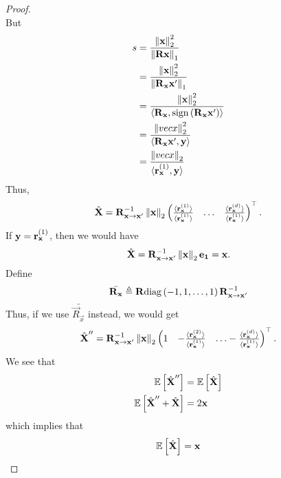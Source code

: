 \documentclass[twoside]{article}
\begin{document}
\begin{proof}
\begin{equation}
    \end{equation}
    But
    \begin{align}
        s &= \frac{\left\lVert\boldsymbol{\mathbf{x}}\right\rVert_2^2}{\left\lVert\boldsymbol{\mathbf{Rx}}\right\rVert_1} \\
          &= \frac{\left\lVert\boldsymbol{\mathbf{x}}\right\rVert_2^2}{\left\lVert\boldsymbol{\mathbf{R}}_{\boldsymbol{\mathbf{x}}}\boldsymbol{\mathbf{x}}^\prime\right\rVert_1} \\
          &= \frac{\left\lVert\boldsymbol{\mathbf{x}}\right\rVert_2^2}{\langle\boldsymbol{\mathbf{R}}_{\boldsymbol{\mathbf{x}}},\mathrm{sign}\left(\boldsymbol{\mathbf{R}}_{\boldsymbol{\mathbf{x}}}\boldsymbol{\mathbf{x}}^\prime\right)\rangle} \\
          &= \frac{\left\lVert vec{x}\right\rVert_2^2}{\langle\boldsymbol{\mathbf{R}}_{\boldsymbol{\mathbf{x}}}\boldsymbol{\mathbf{x}}^\prime,\boldsymbol{\mathbf{y}}\rangle} \\
          &= \frac{\left\lVert vec{x}\right\rVert_2}{\langle\boldsymbol{\mathbf{r}}_{\boldsymbol{\mathbf{x}}}^{\left(1\right)},\boldsymbol{\mathbf{y}}\rangle}
    \end{align}
    Thus,
    \begin{equation}
        \hat{\boldsymbol{\mathbf{X}}} = \boldsymbol{\mathbf{R}}_{\boldsymbol{\mathbf{x}}\rightarrow\boldsymbol{\mathbf{x}}^\prime}^{-1}\left\lVert\boldsymbol{\mathbf{x}}\right\rVert_2\begin{pmatrix}\frac{\langle\boldsymbol{\mathbf{r}}_{\boldsymbol{\mathbf{x}}}^{\left(1\right)}\rangle}{\langle\boldsymbol{\mathbf{r}}_{\boldsymbol{\mathbf{x}}}^{\left(1\right)}\rangle} & \ldots & \frac{\langle\boldsymbol{\mathbf{r}}_{\boldsymbol{\mathbf{x}}}^{\left(d\right)}\rangle}{\langle\boldsymbol{\mathbf{r}}_{\boldsymbol{\mathbf{x}}}^{\left(1\right)}\rangle}\end{pmatrix}^\top.
    \end{equation}
    If \(\boldsymbol{\mathbf{y}} = \boldsymbol{\mathbf{r}}_{\boldsymbol{\mathbf{x}}}^{\left(1\right)}\), then we would have 
    \begin{equation}
        \hat{\boldsymbol{\mathbf{X}}} = \boldsymbol{\mathbf{R}}_{\boldsymbol{\mathbf{x}}\rightarrow\boldsymbol{\mathbf{x}}^\prime}^{-1}\left\lVert\boldsymbol{\mathbf{x}}\right\rVert_2\boldsymbol{\mathbf{e_1}} = \boldsymbol{\mathbf{x}}.
    \end{equation}
    Define
    \begin{equation}
        \bar{\vec{R}_{\vec{x}}} \triangleq \vec{R}\mathrm{diag}\brak{-1, 1, \ldots, 1}\vec{R}_{\vec{x}\rightarrow\vec{x}^\prime}^{-1}
        \label{eq:Rxbar-def}
    \end{equation}
    Thus, if we use \(\bar{\vec{R}_{\vec{x}}}\) instead, we would get
    \begin{equation}
        \hat{\vec{X}}^{\prime\prime} = \vec{R}_{\vec{x}\rightarrow\vec{x}^\prime}^{-1}\norm{\vec{x}}_2\myvec{1 & -\frac{\langle\vec{r}_{\vec{x}}^{\brak{2}}\rangle}{\langle\vec{r}_{\vec{x}}^{\brak{1}}\rangle} & \ldots -\frac{\langle\vec{r}_{\vec{x}}^{\brak{d}}\rangle}{\langle\vec{r}_{\vec{x}}^{\brak{1}}\rangle}}^\top.
        \label{eq:Xhat-dpr-def}
    \end{equation}
    We see that
    \begin{align}
        \mathbb{E}\left[ \hat{\boldsymbol{\mathbf{X}}}^{\prime\prime} \right] &= \mathbb{E}\left[ \hat{\boldsymbol{\mathbf{X}}} \right] \\
        \mathbb{E}\left[ \hat{\boldsymbol{\mathbf{X}}}^{\prime\prime}+\hat{\boldsymbol{\mathbf{X}}} \right] &= 2\boldsymbol{\mathbf{x}}
    \end{align}
    which implies that
    \begin{equation}
        \mathbb{E}\left[ \hat{\boldsymbol{\mathbf{X}}} \right] = \boldsymbol{\mathbf{x}}
    \end{equation}
\end{proof}
\end{document}
